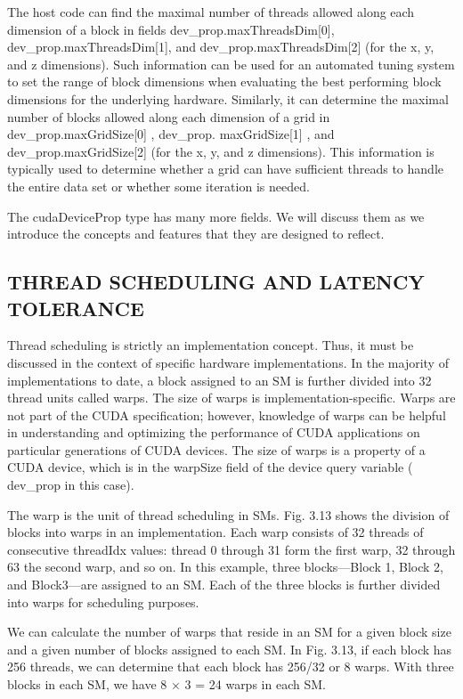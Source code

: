 \documentclass[11pt]{ctexart}
\begin{document}
The host code can find the maximal number of threads allowed along each dimension of a block in fields dev\_prop.maxThreadsDim[0], dev\_prop.maxThreadsDim[1], and dev\_prop.maxThreadsDim[2] (for the x, y, and z dimensions).
Such information can be used for an automated tuning system to set the range of block dimensions when evaluating the best performing block dimensions for the  underlying hardware. Similarly, it can determine the maximal number of blocks allowed along each dimension of a grid in dev\_prop.maxGridSize[0] , dev\_prop.
maxGridSize[1] , and dev\_prop.maxGridSize[2] (for the x, y, and z dimensions). This information is typically used to determine whether a grid can have sufficient threads to handle the entire data set or whether some iteration is needed.

The cudaDeviceProp type has many more fields. We will discuss them as we
introduce the concepts and features that they are designed to reflect.

\subsection{THREAD SCHEDULING AND LATENCY TOLERANCE}

Thread scheduling is strictly an implementation concept. Thus, it must be discussed in the context of specific hardware implementations. In the majority of implementations to date, a block assigned to an SM is further divided into 32 thread units called warps. The size of warps is implementation-specific. Warps are not part of the CUDA specification; however, knowledge of warps can be helpful in understanding
and optimizing the performance of CUDA applications on particular generations of CUDA devices. The size of warps is a property of a CUDA device, which is in the warpSize field of the device query variable ( dev\_prop in this case).

The warp is the unit of thread scheduling in SMs. Fig. 3.13 shows the division
of blocks into warps in an implementation. Each warp consists of 32 threads of consecutive threadIdx values: thread 0 through 31 form the first warp, 32 through 63 the second warp, and so on. In this example, three blocks—Block 1, Block 2, and Block3—are assigned to an SM. Each of the three blocks is further divided into warps for scheduling purposes.

We can calculate the number of warps that reside in an SM for a given block size and a given number of blocks assigned to each SM. In Fig. 3.13, if each block has 256 threads, we can determine that each block has 256/32 or 8 warps. With three blocks in each SM, we have 8 × 3 = 24 warps in each SM.
\end{document}

